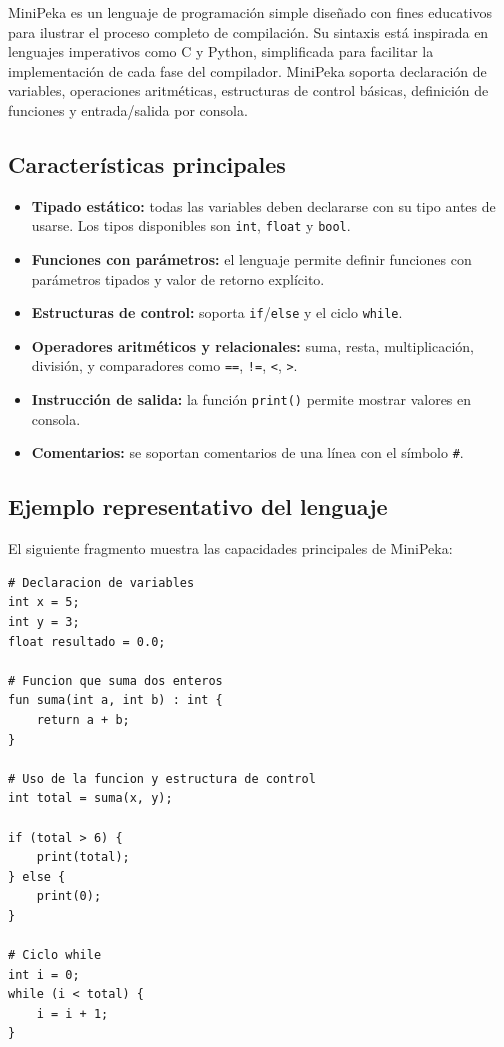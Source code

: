 \documentclass[12pt]{article}
\begin{document}
MiniPeka es un lenguaje de programación simple diseñado con fines educativos
para ilustrar el proceso completo de compilación. Su sintaxis está inspirada
en lenguajes imperativos como C y Python, simplificada para facilitar la
implementación de cada fase del compilador. MiniPeka soporta declaración de
variables, operaciones aritméticas, estructuras de control básicas, definición
de funciones y entrada/salida por consola.

\subsection{Características principales}

\begin{itemize}
    \item \textbf{Tipado estático:} todas las variables deben declararse con
          su tipo antes de usarse. Los tipos disponibles son \texttt{int},
          \texttt{float} y \texttt{bool}.

    \item \textbf{Funciones con parámetros:} el lenguaje permite definir
          funciones con parámetros tipados y valor de retorno explícito.

    \item \textbf{Estructuras de control:} soporta \texttt{if}/\texttt{else}
          y el ciclo \texttt{while}.

    \item \textbf{Operadores aritméticos y relacionales:} suma, resta,
          multiplicación, división, y comparadores como \texttt{==},
          \texttt{!=}, \texttt{<}, \texttt{>}.

    \item \textbf{Instrucción de salida:} la función \texttt{print()}
          permite mostrar valores en consola.

    \item \textbf{Comentarios:} se soportan comentarios de una línea con
          el símbolo \texttt{\#}.
\end{itemize}

\subsection{Ejemplo representativo del lenguaje}

El siguiente fragmento muestra las capacidades principales de MiniPeka:

\begin{lstlisting}[caption={Ejemplo general de MiniPeka}]
# Declaracion de variables
int x = 5;
int y = 3;
float resultado = 0.0;

# Funcion que suma dos enteros
fun suma(int a, int b) : int {
    return a + b;
}

# Uso de la funcion y estructura de control
int total = suma(x, y);

if (total > 6) {
    print(total);
} else {
    print(0);
}

# Ciclo while
int i = 0;
while (i < total) {
    i = i + 1;
}
\end{lstlisting}
\end{document}
